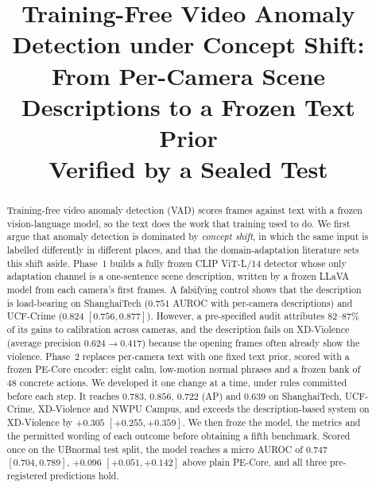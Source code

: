 \documentclass[conference,a4paper]{IEEEtran}
\begin{document}
\title{Training-Free Video Anomaly Detection under Concept Shift:\\
From Per-Camera Scene Descriptions to a Frozen Text Prior\\
Verified by a Sealed Test}

\author{
\and
{}
}

\maketitle

\begin{abstract}
Training-free video anomaly detection (VAD) scores frames against text with a
frozen vision-language model, so the text does the work that training used to
do. We first argue that anomaly
detection is dominated by \emph{concept shift}, in which the same input is
labelled differently in different places, and that the domain-adaptation
literature sets this shift aside. Phase~1 builds a fully frozen CLIP ViT-L/14
detector whose only adaptation channel is a one-sentence scene description, written by a frozen LLaVA model from each
camera's first frames. A falsifying control shows that the description is
load-bearing on ShanghaiTech ($0.751$ AUROC with per-camera descriptions) and
UCF-Crime ($0.824$ $[0.756, 0.877]$). However, a pre-specified audit attributes
$82$--$87\%$ of its gains to calibration across cameras, and the description
fails on XD-Violence (average precision $0.624 \to 0.417$) because the opening
frames often already show the violence. Phase~2 replaces per-camera text with
one fixed text prior, scored with a frozen PE-Core encoder: eight calm,
low-motion normal phrases and a frozen bank of 48 concrete actions. We developed
it one change at a time, under rules committed before each step. It reaches
$0.783$, $0.856$, $0.722$ (AP) and $0.639$ on ShanghaiTech, UCF-Crime,
XD-Violence and NWPU Campus, and exceeds the description-based system on
XD-Violence by $+0.305$ $[+0.255, +0.359]$. We then froze the model, the metrics
and the permitted wording of each outcome before obtaining a fifth benchmark.
Scored once on the UBnormal test split, the model reaches a micro AUROC of
$0.747$ $[0.704, 0.789]$, $+0.096$ $[+0.051, +0.142]$ above plain PE-Core, and
all three pre-registered predictions hold.
\end{abstract}
\end{document}
